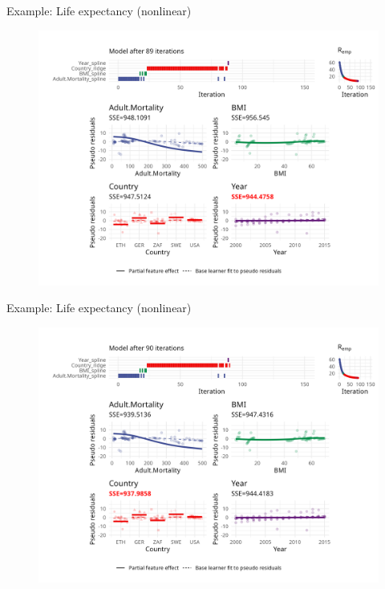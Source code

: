 \begin{frame}{Example: Life expectancy (nonlinear)}
	\begin{figure}
		\centering
		\includegraphics[width=\textwidth]{figure/cwb-anim-nl/fig-iter-0089.png}
	\end{figure}
	\addtocounter{framenumber}{-1}
\end{frame}


\begin{frame}{Example: Life expectancy (nonlinear)}
	\begin{figure}
		\centering
		\includegraphics[width=\textwidth]{figure/cwb-anim-nl/fig-iter-0090.png}
	\end{figure}
	\addtocounter{framenumber}{-1}
\end{frame}



